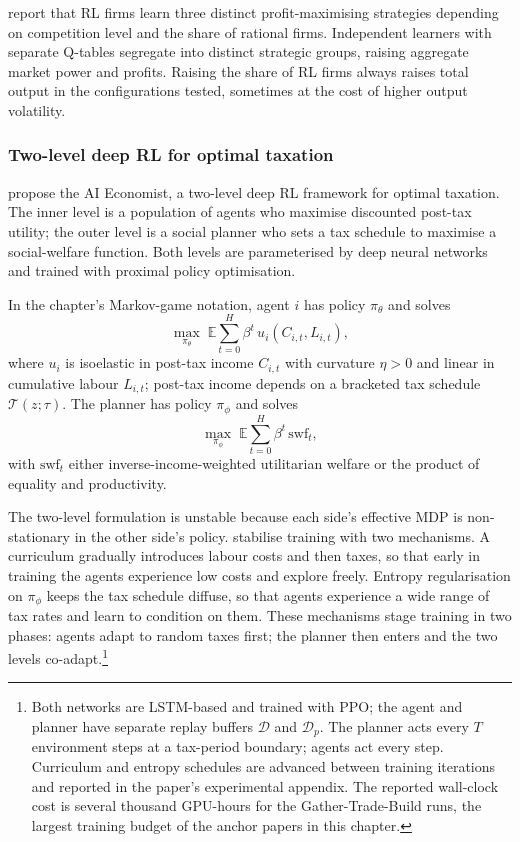\citet{Brusatin2024rmabm} report that RL firms learn three distinct
profit-maximising strategies depending on competition level and the
share of rational firms. Independent learners with separate Q-tables
segregate into distinct strategic groups, raising aggregate market
power and profits. Raising the share of RL firms always raises total
output in the configurations tested, sometimes at the cost of higher
output volatility.

\subsubsection{Two-level deep RL for optimal taxation}
\label{sec:macro:aie}

\citet{Zheng2022aie} propose the AI Economist, a two-level deep RL
framework for optimal taxation. The inner level is a population of
agents who maximise discounted post-tax utility; the outer level is
a social planner who sets a tax schedule to maximise a social-welfare
function. Both levels are parameterised by deep neural networks and
trained with proximal policy optimisation.

In the chapter's Markov-game notation, agent $i$ has policy
$\pi_\theta$ and solves
\begin{equation}
\max_{\pi_\theta}\; \mathbb{E}\sum_{t=0}^{H} \beta^t\, u_i(C_{i,t}, L_{i,t}),
\label{eq:macro:aie-agent}
\end{equation}
where $u_i$ is isoelastic in post-tax income $C_{i,t}$ with curvature
$\eta > 0$ and linear in cumulative labour $L_{i,t}$; post-tax income
depends on a bracketed tax schedule $\mathcal T(z; \tau)$. The
planner has policy $\pi_\phi$ and solves
\begin{equation}
\max_{\pi_\phi}\; \mathbb{E}\sum_{t=0}^{H} \beta^t\, \text{swf}_t,
\label{eq:macro:aie-planner}
\end{equation}
with $\text{swf}_t$ either inverse-income-weighted utilitarian welfare
or the product of equality and productivity.

The two-level formulation is unstable because each side's effective
MDP is non-stationary in the other side's policy. \citet{Zheng2022aie}
stabilise training with two mechanisms. A curriculum gradually
introduces labour costs and then taxes, so that early in training
the agents experience low costs and explore freely. Entropy
regularisation on $\pi_\phi$ keeps the tax schedule diffuse, so that
agents experience a wide range of tax rates and learn to condition
on them. These mechanisms stage training in two phases: agents adapt
to random taxes first; the planner then enters and the two levels
co-adapt.\footnote{Both networks are LSTM-based and trained with PPO;
the agent and planner have separate replay buffers $\mathcal{D}$ and
$\mathcal{D}_p$. The planner acts every $T$ environment steps at a
tax-period boundary; agents act every step. Curriculum and entropy
schedules are advanced between training iterations and reported in
the paper's experimental appendix. The reported wall-clock cost is
several thousand GPU-hours for the Gather-Trade-Build runs, the
largest training budget of the anchor papers in this chapter.}

